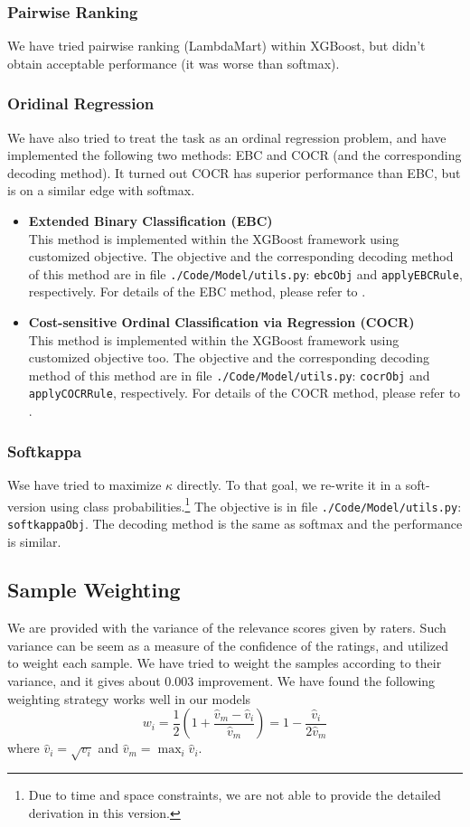 \documentclass[12pt]{article}
\begin{document}
\subsubsection{Pairwise Ranking}
We have tried pairwise ranking (LambdaMart) within XGBoost, but didn't obtain acceptable performance (it was worse than softmax).

\subsubsection{Oridinal Regression}
We have also tried to treat the task as an ordinal regression problem, and have implemented the following two methods: EBC and COCR (and the corresponding decoding method). It turned out COCR has superior performance than EBC, but is on a similar edge with softmax.
\begin{itemize}
\item \textbf{Extended Binary Classification (EBC)}\\
This method is implemented within the XGBoost framework using customized objective. The objective and the corresponding decoding method of this method are in file \texttt{./Code/Model/utils.py}: \texttt{ebcObj} and \texttt{applyEBCRule}, respectively. For details of the EBC method, please refer to \cite{ebc}.
\item \textbf{Cost-sensitive Ordinal Classification via Regression (COCR)}\\
This method is implemented within the XGBoost framework using customized objective too. The objective and the corresponding decoding method of this method are in file \texttt{./Code/Model/utils.py}: \texttt{cocrObj} and \texttt{applyCOCRRule}, respectively. For details of the COCR method, please refer to \cite{cocr}.
\end{itemize}

\subsubsection{Softkappa}
Wse have tried to maximize $\kappa$ directly. To that goal, we re-write it in a soft-version using class probabilities.\footnote{Due to time and space constraints, we are not able to provide the detailed derivation in this version.} The objective is in file \texttt{./Code/Model/utils.py}: \texttt{softkappaObj}. The decoding method is the same as softmax and the performance is similar.

\subsection{Sample Weighting}
We are provided with the variance of the relevance scores given by raters. Such variance can be seem as a measure of the confidence of the ratings, and utilized to weight each sample. We have tried to weight the samples according to their variance, and it gives about 0.003 improvement. We have found the following weighting strategy works well in our models
\begin{equation}
w_i = \frac{1}{2}(1 + \frac{\hat{v}_m - \hat{v}_i}{\hat{v}_m})=1-\frac{\hat{v}_i}{2\hat{v}_m}
\end{equation}
where $\hat{v}_i = \sqrt{v_i}$ and $\hat{v}_m = \max_{i} \hat{v}_i$.
\end{document}
